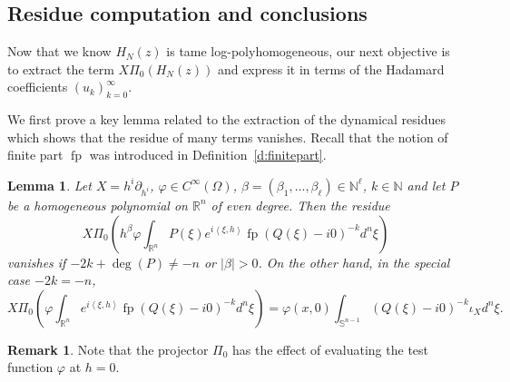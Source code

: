 \documentclass[10pt]{amsart}
\newtheorem{lemma}[theorem]{Lemma}
\theoremstyle{definition}
\newtheorem{remark}[theorem]{Remark}
\newcommand\nn{{\mathbb N}}
\let\euler X
\DeclareMathOperator*{\pf}{fp}
\begin{document}
\subsection{Residue computation and conclusions} \label{ss:rcc} Now that we know $H_N(z)$ is tame log-polyhomogeneous, our next objective is to extract the term
$\euler \Pi_0(H_N(z))$ and express it in terms of the Hadamard coefficients $(u_k)_{k=0}^\infty$.

We first prove a key lemma related to the extraction of the dynamical residues which shows that the residue of many terms vanishes. Recall that the notion of finite part $\pf$ was introduced in Definition~\ref{d:finitepart}.

\begin{lemma}\label{l:vanishlemma2}
Let $\euler=h^i\partial_{h^i}$, $\varphi\in C^\infty(\Omega)$, $\beta=(\beta_1,\dots,\beta_\ell)\in \nn^\ell$, $k\in \mathbb{N}$ and let $P$ be a homogeneous polynomial on $\mathbb{R}^n$ of even
degree.
Then the residue
\[
\euler \Pi_0\left(h^\beta \varphi\int_{\mathbb{R}^n}P(\xi) e^{i\left\langle\xi,h\right\rangle}\pf(Q(\xi)-i0)^{-k}d^n\xi \right)
\]
vanishes if $-2k+\deg(P)\neq -n$ or $\vert \beta\vert>0$. On the other hand, in the special case $-2k=-n$,
\[
\euler \Pi_0\left(\varphi \int_{\mathbb{R}^n} e^{i\left\langle\xi,h\right\rangle}\pf(Q(\xi)-i0)^{-k} d^n\xi\right)=\varphi(x,0)\int_{\mathbb{S}^{n-1}}
(Q(\xi)-i0)^{-k} \iota_\euler d^n\xi.
\]
\end{lemma}
\begin{remark}\label{rem:evalat0}
Note that the projector $\Pi_0$ has the effect of evaluating the test function
$\varphi$ at $h=0$.
\end{remark}
\end{document}
